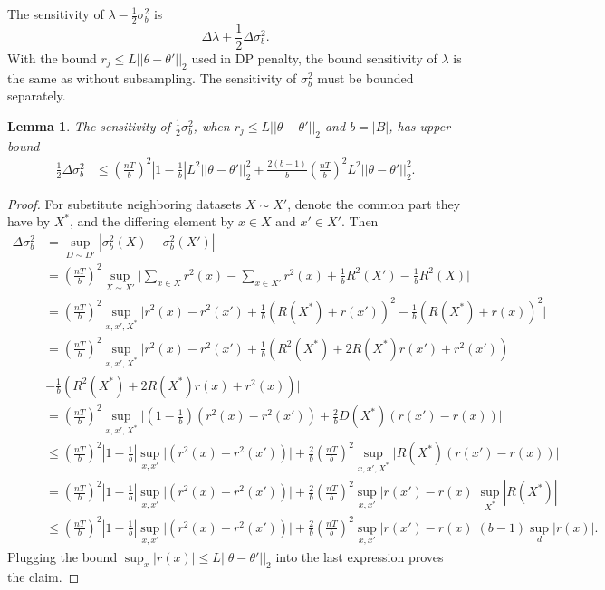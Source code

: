 \documentclass[english,twoside,openright]{HYgraduMLDS}
\newtheorem{lemma}{Lemma}
\begin{document}
The sensitivity of \(\lambda - \frac{1}{2}\sigma_b^2\) is 
\[
    \Delta \lambda + \frac{1}{2}\Delta \sigma_b^2.
\]
With the bound \(r_j \leq L||\theta - \theta'||_2\) used in DP penalty, the 
bound sensitivity of \(\lambda\) is the same as without subsampling.
The sensitivity of \(\sigma_b^2\) must be bounded separately.
\begin{lemma}\label{variance_sensitivity_lemma}
    The sensitivity of \(\frac{1}{2}\sigma_b^2\), 
    when \(r_j \leq L||\theta - \theta'||_2\) and \(b = |B|\), has upper bound
    \begin{align*}
        \frac{1}{2}\Delta \sigma_b^2
        &\leq \left(\frac{nT}{b}\right)^2 \left|1 - \frac{1}{b}\right|
        L^2||\theta - \theta'||_2^2
        + \frac{2(b - 1)}{b}\left(\frac{nT}{b}\right)^2 L^2||\theta - \theta'||^2_2.
    \end{align*}
\end{lemma}
\begin{proof}
    For substitute neighboring datasets \(X \sim X'\), denote the
    common part they have by \(X^*\), and the differing element by \(x\in X\) 
    and \(x'\in X'\). Then
    \begin{align*}
        \Delta \sigma^2_b &= \sup_{D\sim D'} |\sigma^2_b(X) - \sigma^2_b(X')|
        \\&= \left(\frac{nT}{b}\right)^2 \sup_{X\sim X'}\Big|
        \sum_{x\in X}r^2(x) - \sum_{x\in X'}r^2(x)
        + \frac{1}{b}R^2(X') - \frac{1}{b}R^2(X)\Big|
        \\&= \left(\frac{nT}{b}\right)^2 \sup_{x, x', X^*}\Big|
        r^2(x) - r^2(x')
        + \frac{1}{b}(R(X^*) + r(x'))^2 - \frac{1}{b}(R(X^*) + r(x))^2\Big|
        \\&= \left(\frac{nT}{b}\right)^2 \sup_{x, x', X^*}\Big|
        r^2(x) - r^2(x')
        + \frac{1}{b}(R^2(X^*) + 2R(X^*)r(x') + r^2(x'))
        \\&- \frac{1}{b}(R^2(X^*) + 2R(X^*)r(x) + r^2(x))\Big|
        \\&= \left(\frac{nT}{b}\right)^2 \sup_{x, x', X^*}\Big|
        \left(1 - \frac{1}{b}\right)(r^2(x) - r^2(x'))
        + \frac{2}{b}D(X^*)(r(x') - r(x))\Bigg|
        \\&\leq \left(\frac{nT}{b}\right)^2 \left|1 - \frac{1}{b}\right|
        \sup_{x, x'}\Big|(r^2(x) - r^2(x'))\Big|
        + \frac{2}{b}\left(\frac{nT}{b}\right)^2 \sup_{x, x', X^*}\Big|
        R(X^*)(r(x') - r(x))\Bigg|
        \\&= \left(\frac{nT}{b}\right)^2 \left|1 - \frac{1}{b}\right|
        \sup_{x, x'}\Big|(r^2(x) - r^2(x'))\Big|
        + \frac{2}{b}\left(\frac{nT}{b}\right)^2
        \sup_{x, x'}|r(x') - r(x)|
        \sup_{X^*}|R(X^*)|
        \\&\leq \left(\frac{nT}{b}\right)^2 \left|1 - \frac{1}{b}\right|
        \sup_{x, x'}\Big|(r^2(x) - r^2(x'))\Big|
        + \frac{2}{b}\left(\frac{nT}{b}\right)^2
        \sup_{x, x'}|r(x') - r(x)|(b - 1)\sup_{d}|r(x)|.
    \end{align*}
    Plugging the bound \(\sup_x |r(x)| \leq L||\theta - \theta'||_2\) 
    into the last expression proves the claim.
\end{proof}
\end{document}
